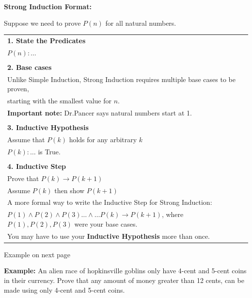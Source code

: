 \documentclass{article}
\begin{document}
\textbf{Strong Induction Format:}

Suppose we need to prove $P(n)$ for all natural numbers.

\begin{center}
\begin{tabular}{l}
\textbf{1. State the Predicates}\\
$P(n): \dots$\\

 \\

\textbf{2. Base cases}\\
Unlike Simple Induction, Strong Induction requires multiple base cases to be proven, \\
starting with the smallest value for $n$.\\
\textbf{Important note:} Dr.Pancer says natural numbers start at 1.\\

 \\

\textbf{3. Inductive Hypothesis}\\
Assume that $P(k)$ holds for any arbitrary $k$\\
$P(k): \dots$ is True.\\

 \\

\textbf{4. Inductive Step}\\
Prove that $P(k) \rightarrow P(k + 1)$\\
Assume $P(k)$ then show $P(k+1)$\\
A more formal way to write the Inductive Step for Strong Induction:\\
$P(1) \land P(2) \land P(3) \dots \land \dots P(k) \rightarrow P(k+1)$, where $P(1), P(2), P(3)$ were your base cases.\\
You may have to use your \textbf{Inductive Hypothesis} more than once.\\
\end{tabular}

\vspace{0.5cm}

Example on next page

\end{center}

\pagebreak

\text{}

\vspace{0.5cm}

\textbf{Example:} An alien race of hopkinsville goblins only have 4-cent and 5-cent coins in their currency. Prove that any amount of money greater than 12 cents, can be made using only 4-cent and 5-cent coins.
\end{document}
